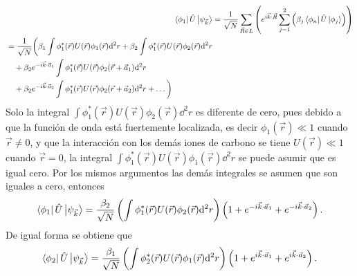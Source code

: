 \begin{align}
	\nonumber \bra{\phi_1} \hat{U}\ket{\psi_{\vec{k}}} & = \frac{1}{\sqrt{N}}\sum_{\vec{R}\in L}\left(e^{i \vec{k}\cdot \vec{R}}\sum_{j=1}^{2}\left(\beta_j\bra{\phi_n} \hat{U}\ket{\phi_j}\right)\right)                                                                                                                                                                                                                                                                                                                                                                                                              \\
		\begin{split}
		          & = \frac{1}{\sqrt{N}}\bigg(\beta_1 \int \phi_1^{\ast}(\vec{r}) U(\vec{r})\phi_1(\vec{r}) \dd^2 r +\beta_2 \int \phi_1^{\ast}(\vec{r}) U(\vec{r})\phi_2(\vec{r}) \dd^2 r \\&\quad  + \beta_2 e^{-i \vec{k}\cdot \vec{a}_1}\int \phi_1^{\ast}(\vec{r}) U(\vec{r})\phi_2(\vec{r}+\vec{a}_1) \dd^2 r\\&\quad + \beta_2 e^{-i \vec{k}\cdot \vec{a}_2}\int \phi_1^{\ast}(\vec{r}) U(\vec{r})\phi_2(\vec{r}+\vec{a}_2) \dd^2 r + \ldots\bigg)
	          \end{split} 
\end{align}
Solo la integral $\int \phi^{\ast}_1(\vec{r})U(\vec{r})\phi_2(\vec{r}) \dd^2 r$ es diferente de cero, pues debido a que la función de onda está fuertemente localizada, es decir $\phi_1(\vec{r})\ll 1$ cuando $\vec{r}\neq 0$, y que la interacción con los demás iones de carbono se tiene $U(\vec{r})\ll 1$ cuando $\vec{r}=0$, la integral $\int \phi_1^{\ast}(\vec{r}) U(\vec{r}) \phi_1(\vec{r}) \dd^2 r$ se puede asumir que es igual cero. Por los mismos argumentos las demás integrales se asumen que son iguales a cero, entonces
\begin{equation}
   \bra{\phi_1}\hat{U}\ket{\psi_{\vec{k}}} = \frac{\beta_2}{\sqrt{N}}\left(\int \phi_1^{\ast}(\vec{r}) U(\vec{r}) \phi_2(\vec{r}) \dd^2 r\right)\left(1+e^{-i \vec{k}\cdot \vec{a}_1}+e^{-i \vec{k}\cdot \vec{a}_2}\right).
\end{equation}
De igual forma se obtiene que
\begin{equation}
	\bra{\phi_2} \hat{U} \ket{\psi_{\vec{k}}} = \frac{\beta_1}{\sqrt{N}}\left(\int \phi_2^{\ast}(\vec{r}) U(\vec{r})\phi_1(\vec{r}) \dd^2 r\right)\left(1+e^{i \vec{k}\cdot \vec{a}_1}+e^{i \vec{k}\cdot \vec{a}_2}\right).
\end{equation}
